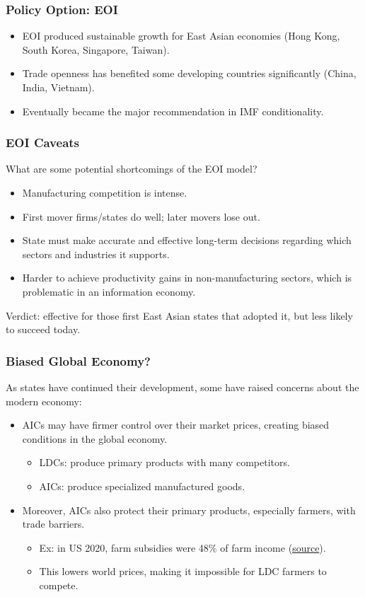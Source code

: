 \documentclass[handout]{beamer}
\begin{document}
\begin{frame} 
	\frametitle{\LARGE{Policy Option: EOI}} 
		\begin{itemize}
			\item EOI produced sustainable growth for East Asian economies (Hong Kong, South Korea, Singapore, Taiwan). \pause
			\item Trade openness has benefited some developing countries significantly (China, India, Vietnam). \pause 
			\item Eventually became the major recommendation in IMF conditionality. 
		\end{itemize}

\end{frame}

\begin{frame} 
	\frametitle{\LARGE{EOI Caveats}} 
What are some potential shortcomings of the EOI model?
	\begin{itemize}
		\item Manufacturing competition is intense. \pause 
		\item First mover firms/states do well; later movers lose out. \pause 
		\item State must make accurate and effective long-term decisions regarding which sectors and industries it supports. \pause
		\item Harder to achieve productivity gains in non-manufacturing sectors, which is problematic in an information economy. \pause 
	\end{itemize}
Verdict: effective for those first East Asian states that adopted it, but less likely to succeed today.
\end{frame}

\begin{frame} 
	\frametitle{\LARGE{Biased Global Economy?}}
	As states have continued their development, some have raised concerns about the modern economy:
	\begin{itemize}
			\item AICs may have firmer control over their market prices, creating biased conditions in the global economy. \pause 
			\begin{itemize}
			    \item LDCs: produce primary products with many competitors. \pause 
			    \item AICs: produce specialized manufactured goods. \pause 
			\end{itemize}
			\item Moreover, AICs also protect their primary products, especially farmers, with trade barriers. \pause
			\begin{itemize}
			    \item Ex: in US 2020, farm subsidies were 48\% of farm income (\href{https://www.fb.org/market-intel/2022-farm-profitability-outlook-production-expenses-up-net-farm-income-down}{source}). \pause 
			    \item This lowers world prices, making it impossible for LDC farmers to compete.  
			\end{itemize}
	\end{itemize}
\end{frame}
\end{document}
